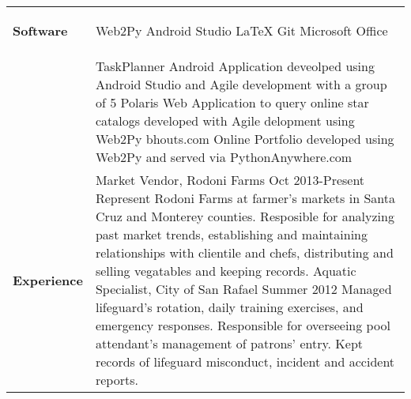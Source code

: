 \documentclass[11pt]{article}
\begin{document}
\begin{tabular}{p{3.3cm}  p{13cm}}
\\
\textbf{Software}  & \vspace{-7.7mm}
	\begin{multicols}{2}
				Web2Py \newline
				Android Studio \newline
				\LaTeX \newline
				Git \newline
				Microsoft Office 
	\end{multicols}
\\
\color{blue}{\textbf{Projects}}  & \vspace{0mm}
		TaskPlanner \hspace{3.51mm} \normalsize 
			Android Application deveolped using Android Studio \hspace*{4.08cm} and Agile development 				with a group of 5 \newline\Large
		Polaris \hspace{1.7cm} \normalsize
			Web Application to query online star catalogs developed \hspace*{4.08cm}with Agile 								delopment using Web2Py \newline\Large
		bhouts.com \hspace{7mm} \normalsize 
			Online Portfolio developed using Web2Py and served via \hspace*{4.08cm}												PythonAnywhere.com\newline\Large
			
\\
\vspace{-1cm}

\textbf{Experience}  &  \vspace{-1cm}
Market Vendor, Rodoni Farms \hspace{3cm}\normalsize Oct 2013-Present\newline\normalsize 
Represent Rodoni Farms at farmer's markets in Santa Cruz and Monterey counties. Resposible for analyzing past market trends, establishing and maintaining relationships with clientile and chefs, distributing and selling vegatables and keeping records.
 \Large \vspace{2mm}
\newline 
Aquatic Specialist, City of San Rafael \hspace{2.2cm} \normalsize Summer 2012\newline\normalsize
Managed lifeguard's rotation, daily training exercises, and emergency responses. Responsible for overseeing pool attendant's management of patrons' entry. Kept records of lifeguard misconduct, incident and accident reports.




\end{tabular}
\end{document}
